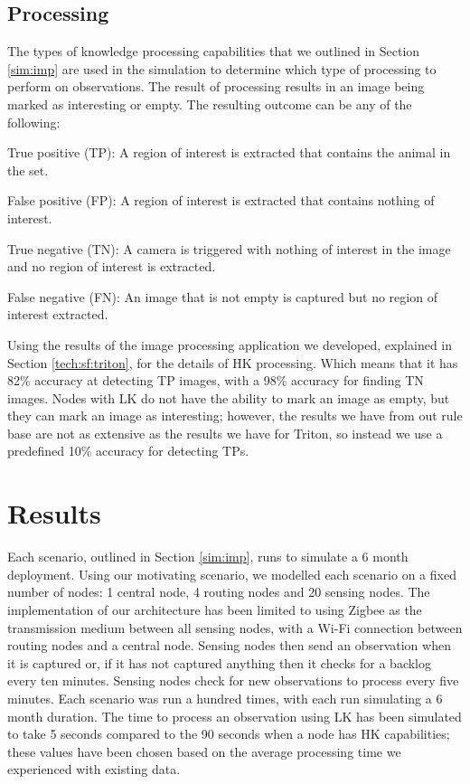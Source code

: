 \subsection{Processing}
	The types of knowledge processing capabilities that we outlined in Section \ref{sim:imp} are used in the simulation to determine which type of processing to perform on observations. The result of processing results in an image being marked as interesting or empty. The resulting outcome can be any of the following:
		\begin{description}
			\item True positive (TP): A region of interest is extracted that contains the animal in the set.
			\item False positive (FP): A region of interest is extracted that contains nothing of interest.
			\item True negative (TN): A camera is triggered with nothing of interest in the image and no region of interest is extracted.
			\item False negative (FN): An image that is not empty is captured but no region of interest extracted.
		\end{description}
	
	Using the results of the image processing application we developed, explained in Section \ref{tech:sf:triton}, for the details of HK processing. Which means that it has 82\% accuracy at detecting TP images, with a 98\% accuracy for finding TN images. Nodes with LK do not have the ability to mark an image as empty, but they can mark an image as interesting; however, the results we have from out rule base are not as extensive as the results we have for Triton, so instead we use a predefined 10\% accuracy for detecting TPs.
	

\section{Results}
Each scenario, outlined in Section \ref{sim:imp}, runs to simulate a 6 month deployment. Using our motivating scenario, we modelled each scenario on a fixed number of nodes: 1 central node, 4 routing nodes and 20 sensing nodes. The implementation of our architecture has been limited to using Zigbee as the transmission medium between all sensing nodes, with a Wi-Fi connection between routing nodes and a central node. Sensing nodes then send an observation when it is captured or, if it has not captured anything then it checks for a backlog every ten minutes. Sensing nodes check for new observations to process every five minutes. Each scenario was run a hundred times, with each run simulating a 6 month duration. The time to process an observation using LK has been simulated to take 5 seconds compared to the 90 seconds when a node has HK capabilities; these values have been chosen based on the average processing time we experienced with existing data.

